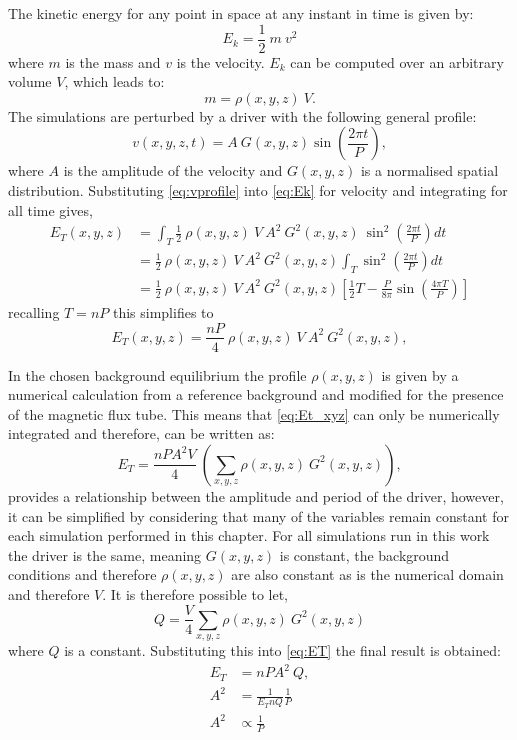 The kinetic energy for any point in space at any instant in time is given by:
\begin{equation}
    E_k = \frac{1}{2}\ m\ v^2\label{eq:Ek}
\end{equation}
where $m$ is the mass and $v$ is the velocity.
$E_k$ can be computed over an arbitrary volume $V$, which leads to:
\begin{equation}
    m = \rho(x,y,z)\ V.\label{eq:mass}
\end{equation}
The simulations are perturbed by a driver with the following general profile:
\begin{equation}
    v(x,y,z,t) = A\ G(x,y,z) \sin \left( \frac{2\pi t}{P} \right),\label{eq:vprofile}
\end{equation}
where $A$ is the amplitude of the velocity and $G(x,y,z)$ is a normalised spatial distribution.
Substituting \cref{eq:vprofile} into \cref{eq:Ek} for velocity and integrating for all time gives,
\begin{align}
    E_{T}(x,y,z) &= \int_T \frac{1}{2}\ \rho(x,y,z)\ V\ A^2\ G^2(x,y,z)\ \sin^2\left(\frac{2\pi t}{P} \right) dt \\
    &= \frac{1}{2}\ \rho(x,y,z)\ V\ A^2\ G^2(x,y,z) \int_T \sin^2\left(\frac{2\pi t}{P} \right) dt \\
    & = \frac{1}{2}\ \rho(x,y,z)\ V\ A^2\ G^2(x,y,z) \left[ \frac{1}{2}T - \frac{P}{8\pi} \sin \left(\frac{4\pi T}{P} \right) \right]
\end{align}
recalling $T = nP$ this simplifies to 
\begin{equation}
    E_{T}(x,y,z) = \frac{nP}{4}\ \rho(x,y,z)\ V\ A^2\ G^2(x,y,z), \label{eq:Et_xyz}
\end{equation}

In the chosen background equilibrium the profile $\rho(x,y,z)$ is given by a numerical calculation from a reference background and modified for the presence of the magnetic flux tube.
This means that \cref{eq:Et_xyz} can only be numerically integrated and therefore, can be written as:
\begin{equation}
    E_T = \frac{nPA^2V}{4}\ \left( \sum_{x,y,z} \rho(x,y,z)\ G^2(x,y,z) \right),\label{eq:ET}
\end{equation}
 provides a relationship between the amplitude and period of the driver, however, it can be simplified by considering that many of the variables remain constant for each simulation performed in this chapter.
For all simulations run in this work the driver is the same, meaning $G(x,y,z)$ is constant, the background conditions and therefore $\rho(x,y,z)$ are also constant as is the numerical domain and therefore $V$.
It is therefore possible to let,
\begin{equation}
    Q = \frac{V}{4} \sum_{x,y,z} \rho(x,y,z)\ G^2(x,y,z)
\end{equation}
where $Q$ is a constant.
Substituting this into \cref{eq:ET} the final result is obtained:
\begin{align}
    E_T &= nPA^2\ Q, \\
    A^2 &= \frac{1}{E_T n Q} \frac{1}{P} \\
    A^2 &\propto \frac{1}{P}
\end{align}

